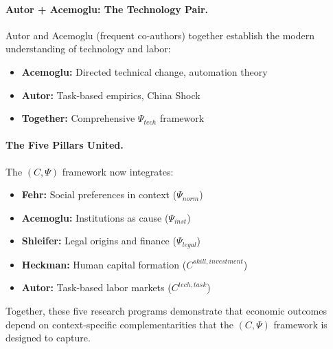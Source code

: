 \paragraph{Autor + Acemoglu: The Technology Pair.}
Autor and Acemoglu (frequent co-authors) together establish the modern
understanding of technology and labor:
\begin{itemize}
  \item \textbf{Acemoglu:} Directed technical change, automation theory
  \item \textbf{Autor:} Task-based empirics, China Shock
  \item \textbf{Together:} Comprehensive $\Psi_{tech}$ framework
\end{itemize}

\paragraph{The Five Pillars United.}
The $(C, \Psi)$ framework now integrates:
\begin{itemize}
  \item \textbf{Fehr:} Social preferences in context ($\Psi_{norm}$)
  \item \textbf{Acemoglu:} Institutions as cause ($\Psi_{inst}$)
  \item \textbf{Shleifer:} Legal origins and finance ($\Psi_{legal}$)
  \item \textbf{Heckman:} Human capital formation ($C^{skill,investment}$)
  \item \textbf{Autor:} Task-based labor markets ($C^{tech,task}$)
\end{itemize}

Together, these five research programs demonstrate that economic outcomes
depend on context-specific complementarities that the $(C, \Psi)$ framework
is designed to capture.

